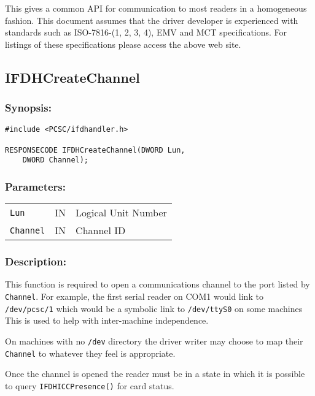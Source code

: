 \documentclass[a4paper,12pt]{article}
\newcommand{\synopsis}{\subsubsection{Synopsis:}}
\newcommand{\parameters}{\subsubsection{Parameters:}}
\newcommand{\desc}{\subsubsection{Description:}}
\begin{document}
This gives a common API for communication to most readers in a
homogeneous fashion. This document assumes that the driver developer is
experienced with standards such as ISO-7816-(1, 2, 3, 4), EMV and MCT
specifications. For listings of these specifications please access the
above web site.


\subsection{IFDHCreateChannel}

\synopsis

\begin{verbatim}
#include <PCSC/ifdhandler.h>

RESPONSECODE IFDHCreateChannel(DWORD Lun,
    DWORD Channel);
\end{verbatim}

\parameters

\begin{tabular}{lll}
\texttt{Lun} & IN & Logical Unit Number \\
\texttt{Channel} & IN & Channel ID \\
\end{tabular}

\desc

This function is required to open a communications channel to the port
listed by \texttt{Channel}. For example, the first serial reader on COM1
would link to \texttt{/dev/pcsc/1} which would be a symbolic link to
\texttt{/dev/ttyS0} on some machines This is used to help with
inter-machine independence.

On machines with no \texttt{/dev} directory the driver writer may choose to
map their \texttt{Channel} to whatever they feel is appropriate.

Once the channel is opened the reader must be in a state in which it is
possible to query \texttt{IFDHICCPresence()} for card status.
\end{document}

